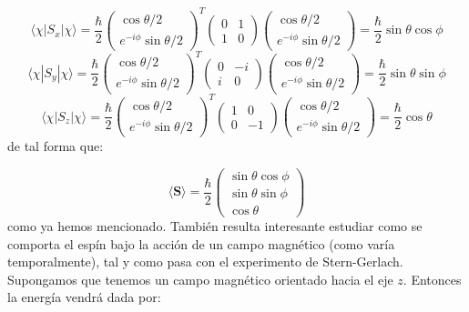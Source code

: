 \documentclass[12pt,a4paper]{article}
\numberwithin{equation}{section}
\numberwithin{figure}{section}
\newcommand{\Sn}{\mathbf{S}}
\begin{document}
\begin{equation}
\langle \chi | S_x | \chi \rangle = \frac{\hbar}{2}
\begin{pmatrix}
\cos \theta/2 \\
 e^{-i\phi} \sin \theta/2
\end{pmatrix}^T \begin{pmatrix}
0 & 1 \\
1 & 0 
\end{pmatrix}
\begin{pmatrix}
\cos \theta/2 \\
 e^{-i\phi} \sin \theta/2
\end{pmatrix} = \frac{\hbar}{2}  \sin \theta \cos \phi
\end{equation}
\begin{equation}
\langle \chi | S_y | \chi \rangle = \frac{\hbar}{2}
\begin{pmatrix}
\cos \theta/2 \\
 e^{-i\phi} \sin \theta/2
\end{pmatrix}^T \begin{pmatrix}
0 & -i \\
i & 0 
\end{pmatrix}
\begin{pmatrix}
\cos \theta/2 \\
 e^{-i\phi} \sin \theta/2
\end{pmatrix} = \frac{\hbar}{2}  \sin \theta \sin \phi
\end{equation}
\begin{equation}
\langle \chi | S_z | \chi \rangle = \frac{\hbar}{2}
\begin{pmatrix}
\cos \theta/2 \\
 e^{-i\phi} \sin \theta/2
\end{pmatrix}^T \begin{pmatrix}
1 & 0 \\
0 & -1 
\end{pmatrix}
\begin{pmatrix}
\cos \theta/2 \\
 e^{-i\phi} \sin \theta/2
\end{pmatrix} = \frac{\hbar}{2}  \cos \theta 
\end{equation}
de tal forma que:

\begin{equation}
\langle \Sn \rangle = \dfrac{\hbar}{2} \begin{pmatrix}
\sin \theta \cos \phi \\
\sin \theta \sin \phi \\
\cos \theta
\end{pmatrix}
\end{equation}
como ya hemos mencionado. También resulta interesante estudiar como se comporta el espín bajo la acción de un campo magnético (como varía temporalmente), tal y como pasa con el experimento de Stern-Gerlach. Supongamos que tenemos un campo magnético orientado hacia el eje $z$. Entonces la energía vendrá dada por:
\end{document}
